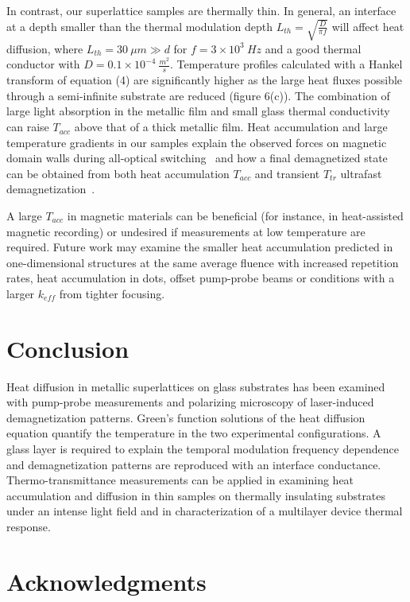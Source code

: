 \documentclass[5p]{elsarticle}
\begin{document}
In contrast, our superlattice samples are thermally thin. In general, an interface at a depth smaller than the thermal modulation depth $L_{th}=\sqrt{\frac{D}{\pi f}}$ will affect heat diffusion, where $L_{th}=30~\mu m \gg d$ for $f=3\times10^{3}~Hz$ and a good thermal conductor with $D=0.1 \times10^{-4}~\frac{m^{2}}{s}$. Temperature profiles calculated with a Hankel transform of equation (4) are significantly higher as the large heat fluxes possible through a semi-infinite substrate are reduced (figure 6(c)). The combination of large light absorption in the metallic film and small glass thermal conductivity can raise $T_{acc}$ above that of a thick metallic film. Heat accumulation and large temperature gradients in our samples explain the observed forces on magnetic domain walls during all-optical switching~\cite{2017F} and how a final demagnetized state can be obtained from both heat accumulation $T_{acc}$ and transient $T_{tr}$ ultrafast demagnetization~\cite{2017F-arXiv}.

A large $T_{acc}$ in magnetic materials can be beneficial (for instance, in heat-assisted magnetic recording) or undesired if measurements at low temperature are required. Future work may examine the smaller heat accumulation predicted in one-dimensional structures at the same average fluence with increased repetition rates, heat accumulation in dots, offset pump-probe beams or conditions with a larger $k_{eff}$ from tighter focusing.

\section{Conclusion}

Heat diffusion in metallic superlattices on glass substrates has been examined with pump-probe measurements and polarizing microscopy of laser-induced demagnetization patterns. Green's function solutions of the heat diffusion equation quantify the temperature in the two experimental configurations. A glass layer is required to explain the temporal modulation frequency dependence and demagnetization patterns are reproduced with an interface conductance. Thermo-transmittance measurements can be applied in examining heat accumulation and diffusion in thin samples on thermally insulating substrates under an intense light field and in characterization of a multilayer device thermal response.

\section*{Acknowledgments}
\end{document}
